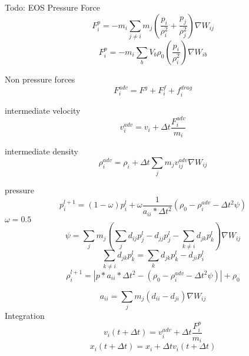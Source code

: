 \documentclass[intern]{cgMA}
\begin{document}
    Todo: EOS
    Pressure Force
    \begin{equation}
        F_i^p = -m_i \sum_{j \neq i} m_j (\frac{p_i}{\rho_i^2} + \frac{p_j}{\rho_j^2})  \nabla W_{ij}
    \end{equation}
    \begin{equation}
        F_i^p = -m_i \sum_{b} V_b \rho_0 (\frac{p_i}{\rho_i^2}) \nabla W_{ib}
    \end{equation}

    Non pressure forces
    \begin{equation}
        F_i^{adv} = F^g + F_i^f + f_i^{drag}
    \end{equation}

    intermediate velocity
    \begin{equation}
        v_i^{adv} = v_i + \Delta t \frac{F_i^{adv}}{m_i}
    \end{equation}

    intermediate density
    \begin{equation}
        \rho_i^{adv} = \rho_i + \Delta t \sum_j m_j v_{ij}^{adv} \nabla W_{ij}
    \end{equation}

    pressure
    \begin{equation}
        p_i^{l+1} = (1 - \omega) p_i^l + \omega \frac{1}{a_{ii} * \Delta t^2} (\rho_0 - \rho_i^{adv} - \Delta t^2 \psi)
    \end{equation}
    $\omega = 0.5$
    \begin{equation}
        \psi = \sum_j m_j (\sum_j d_{ij}p_j^l - d_{jj}p_j^l - \sum_{k \neq i} d_{jk}p_k^l) \nabla W_{ij}
    \end{equation}
    \begin{equation}
        \sum_{k \neq i} d_{jk}p_k^l = \sum_{k} d_{jk}p_k^l - d_{ji}p_i^l
    \end{equation}
    \begin{equation}
        \rho_i^{l+1} = |p * a_{ii} * \Delta t^2 - (\rho_0 - \rho_i^{adv} - \Delta t^2 \psi)| + \rho_0
    \end{equation}

    \begin{equation}
        a_{ii} = \sum_j m_j (d_{ii} - d_{ji}) \nabla W_{ij}
    \end{equation}
    Integration
    \begin{equation}
        v_i(t + \Delta t) = v_i^{adv} + \Delta t \frac{F_i^p}{m_i}
    \end{equation}
    \begin{equation}
        x_i(t + \Delta t) = x_i + \Delta t v_i(t + \Delta t)
    \end{equation}
\end{document}
